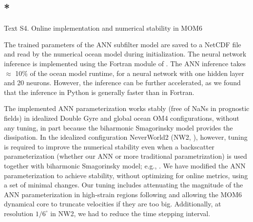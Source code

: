 \documentclass[draft,grl]{agutexSI2019}
\begin{document}
\begin{article}
\section{*}{Text S4. Online implementation and numerical stability in MOM6}

The trained parameters of the ANN subfilter model are saved to a NetCDF file and read by the numerical ocean model during initialization. The neural network inference is implemented using the Fortran module of . The ANN inference takes $\approx$ 10\% of the ocean model runtime, for a neural network with one hidden layer and 20 neurons. However, the inference can be further accelerated, as we found that the inference in Python is generally faster than in Fortran. %

The implemented ANN parameterization works stably (free of NaNs in prognostic fields) in idealized Double Gyre and global ocean OM4 configurations, without any tuning, in part because the biharmonic Smagorinsky model provides the dissipation. In the idealized configuration NeverWorld2 (NW2, ), however, tuning is required to improve the numerical stability even when a backscatter parameterization (whether our ANN or more traditional parametrization) is used together with biharmonic Smagorinsky model; e.g., . 
We have modified the ANN parameterization to achieve stability, without optimizing for online metrics, using a set of minimal changes. Our tuning includes attenuating the magnitude of the ANN parameterization in high-strain regions following  and allowing the MOM6 dynamical core to truncate velocities if they are too big. Additionally, at resolution $1/6^\circ$ in NW2, we had to reduce the time stepping interval.




\end{article}
\newpage
\end{document}
